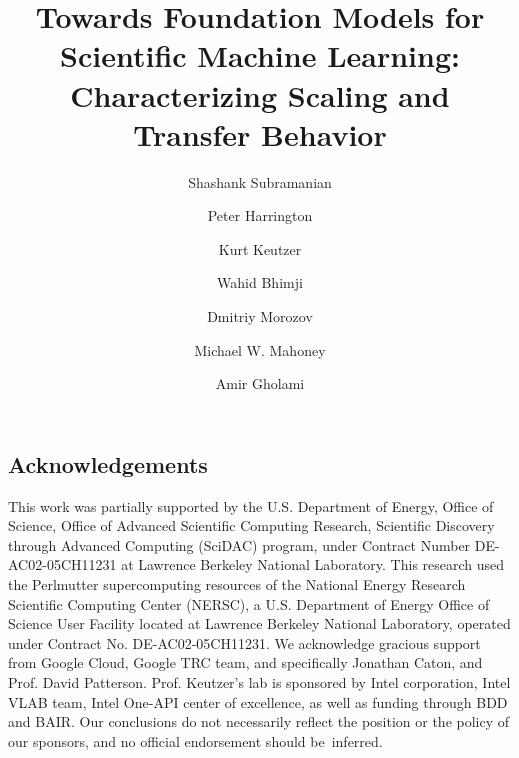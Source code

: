 \documentclass[sigconf, screen, nonacm]{acmart}
\author{Shashank Subramanian}
\affiliation{
  \institution{Lawrence Berkeley National Lab}
  \city{}
  \country{}
}
\author{Peter Harrington}
\affiliation{
  \institution{Lawrence Berkeley National Lab}
  \city{}
  \country{}
}
\author{Kurt Keutzer}
\affiliation{
  \institution{UC Berkeley}
  \city{}
  \country{}
}
\author{Wahid Bhimji}
\affiliation{
  \institution{Lawrence Berkeley National Lab}
  \city{}
  \country{}
}
\author{Dmitriy Morozov}
\affiliation{
  \institution{Lawrence Berkeley National Lab}
  \city{}
  \country{}
}
\author{Michael W. Mahoney}
\affiliation{
  \institution{LBNL, ICSI, and UC Berkeley}
  \city{}
  \country{}
}
\author{Amir Gholami}
\affiliation{
  \institution{ICSI, UC Berkeley}
  \city{}
  \country{}
}
\begin{document}
\title{
Towards Foundation Models for Scientific Machine Learning: Characterizing Scaling and Transfer Behavior 
}

\date{}


\maketitle

\thispagestyle{empty}








\subsection*{Acknowledgements}
This work was partially supported by the U.S. Department of Energy, Office of Science, Office of Advanced Scientific Computing Research, Scientific Discovery through Advanced Computing (SciDAC) program, under Contract Number DE-AC02-05CH11231 at Lawrence Berkeley National Laboratory.
This research used the Perlmutter supercomputing resources of the National Energy Research Scientific Computing Center (NERSC), a U.S. Department of Energy Office of Science User Facility located at Lawrence Berkeley National Laboratory, operated under Contract No. DE-AC02-05CH11231.
We acknowledge gracious support from 
Google Cloud, Google TRC team, and specifically Jonathan Caton, and Prof. David Patterson.
Prof. Keutzer's lab is sponsored by Intel corporation, Intel VLAB team, Intel One-API center of
excellence, as well as funding through BDD and BAIR.
Our conclusions do not necessarily reflect the position or the policy of our sponsors, and no official endorsement should be~inferred.

{
\small


}

\end{document}
